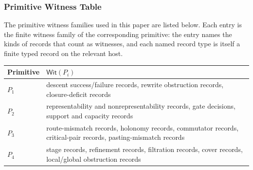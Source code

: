 \documentclass[11pt]{article}
\theoremstyle{definition}
\begin{document}
\subsubsection{Primitive Witness Table}

The primitive witness families used in this paper are listed below. Each entry is the finite witness family of the corresponding primitive: the entry names the kinds of records that count as witnesses, and each named record type is itself a finite typed record on the relevant host.

\begin{longtable}[]{@{}ll@{}}
\toprule
\begin{minipage}[b]{0.47\columnwidth}\raggedright
Primitive\strut
\end{minipage} & \begin{minipage}[b]{0.47\columnwidth}\raggedright
\(\mathsf{Wit}(P_i)\)\strut
\end{minipage}\tabularnewline
\midrule
\endhead
\begin{minipage}[t]{0.47\columnwidth}\raggedright
\(P_1\)\strut
\end{minipage} & \begin{minipage}[t]{0.47\columnwidth}\raggedright
descent success/failure records, rewrite obstruction records, closure-deficit records\strut
\end{minipage}\tabularnewline
\begin{minipage}[t]{0.47\columnwidth}\raggedright
\(P_2\)\strut
\end{minipage} & \begin{minipage}[t]{0.47\columnwidth}\raggedright
representability and nonrepresentability records, gate decisions, support and capacity records\strut
\end{minipage}\tabularnewline
\begin{minipage}[t]{0.47\columnwidth}\raggedright
\(P_3\)\strut
\end{minipage} & \begin{minipage}[t]{0.47\columnwidth}\raggedright
route-mismatch records, holonomy records, commutator records, critical-pair records, pasting-mismatch records\strut
\end{minipage}\tabularnewline
\begin{minipage}[t]{0.47\columnwidth}\raggedright
\(P_4\)\strut
\end{minipage} & \begin{minipage}[t]{0.47\columnwidth}\raggedright
stage records, refinement records, filtration records, cover records, local/global obstruction records\strut

\end{minipage}
\end{longtable}
\end{document}
